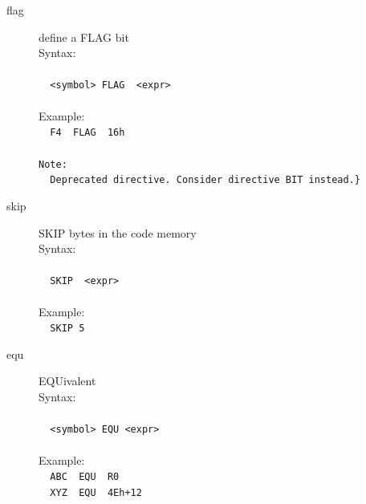 \documentclass[a4paper,twoside,12pt]{book}
\begin{document}
\begin{description}
			\item[flag] define a FLAG bit\\
				Syntax:\\\\
				\verb'  '{\color{highlight_constant}\verb'<symbol>'}\verb' '{\color{highlight_directive}\verb'FLAG'}\verb'  '{\color{highlight_symbol}\verb'<'}{\color{highlight_constant}\verb'expr'}{\color{highlight_symbol}\verb'>'}\\
				\verb''\\
				Example:\\
				\verb'  '{\color{highlight_constant}\verb'F4'}\verb'  '{\color{highlight_directive}\verb'FLAG'}\verb'  '{\color{highlight_hex}\verb'16h'}\\
				\verb''\\
				{\color{highlight_label}\verb'Note:'}\\
				\verb'  '{\color{highlight_macro}\verb'Deprecated'}\verb' '{\color{highlight_constant}\verb'directive. Consider directive BIT instead.}'}\\
			\item[skip] SKIP bytes in the code memory\\
				Syntax:\\\\
				\verb'  '{\color{highlight_directive}\verb'SKIP'}\verb'  '{\color{highlight_symbol}\verb'<'}{\color{highlight_constant}\verb'expr'}{\color{highlight_symbol}\verb'>'}\\
				\verb''\\
				Example:\\
				\verb'  '{\color{highlight_directive}\verb'SKIP'}\verb' '{\color{highlight_unknown_base}\verb'5'}\\
			\item[equ] EQUivalent\\
				Syntax:\\\\
				\verb'  '{\color{highlight_constant}\verb'<symbol>'}\verb' '{\color{highlight_directive}\verb'EQU'}\verb' '{\color{highlight_symbol}\verb'<'}{\color{highlight_constant}\verb'expr'}{\color{highlight_symbol}\verb'>'}\\
				\verb''\\
				Example:\\
				\verb'  '{\color{highlight_constant}\verb'ABC'}\verb'  '{\color{highlight_directive}\verb'EQU'}\verb'  '{\color{highlight_sfr}\verb'R0'}\\
				\verb'  '{\color{highlight_constant}\verb'XYZ'}\verb'  '{\color{highlight_directive}\verb'EQU'}\verb'  '{\color{highlight_hex}\verb'4Eh'}{\color{highlight_symbol}\verb'+'}{\color{highlight_unknown_base}\verb'12'}\\

\end{description}
\end{document}
